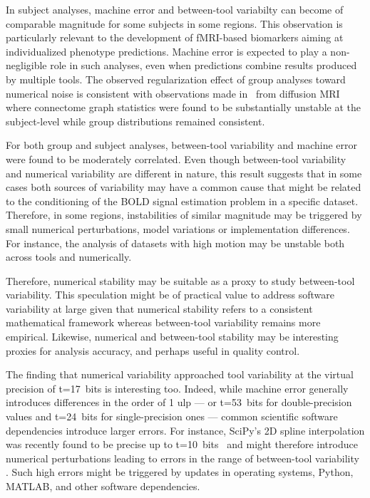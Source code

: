 \documentclass[11pt,onecolumn]{article}
\begin{document}
In subject analyses, machine error and between-tool variabilty can become
of comparable magnitude for some subjects in some regions. This observation
is particularly relevant to the development of fMRI-based biomarkers aiming
at individualized phenotype predictions. Machine error is expected to play
a non-negligible role in such analyses, even when predictions combine
results produced by multiple tools. The observed regularization effect of
group analyses toward numerical noise is consistent with observations made
in~\cite{kiar2020numerical} from diffusion MRI where connectome graph
statistics were found to be substantially unstable at the subject-level
while group distributions remained consistent. 

For both group and subject analyses, between-tool variability and machine
error were found to be moderately correlated. Even though between-tool
variability and numerical variability are different in nature, this result
suggests that in some cases both sources of variability may have a common
cause that might be related to the conditioning of the BOLD signal
estimation problem in a specific dataset. Therefore, in some regions,
instabilities of similar magnitude may be triggered by small numerical
perturbations, model variations or implementation differences. For
instance, the analysis of datasets with high motion may be unstable both 
across tools and numerically. 

Therefore, numerical stability may be suitable as a proxy to study
between-tool variability. This speculation might be of practical value to
address software variability at large given that numerical stability refers
to a consistent mathematical framework whereas between-tool variability
remains more empirical. Likewise, numerical and between-tool stability may
be interesting proxies for analysis accuracy, and perhaps useful in quality
control.

The finding that numerical variability approached tool variability at the
virtual precision of t=17~bits is interesting too. Indeed, while machine
error generally introduces differences in the order of 1 ulp --- or
t=53~bits for double-precision values and t=24~bits for single-precision
ones --- common scientific software dependencies introduce larger errors.
For instance, SciPy's 2D spline interpolation was recently found to be
precise up to t=10~bits~\cite{pytracer} and might therefore introduce
numerical perturbations leading to errors in the range of between-tool
variability . Such high errors
might be triggered by updates in operating systems, Python, MATLAB, and
other software dependencies.
\end{document}
